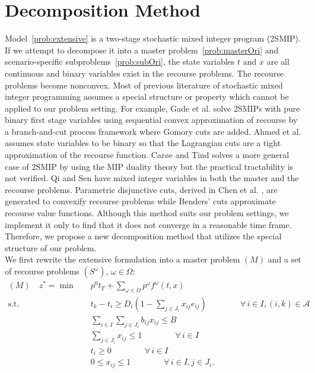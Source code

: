 \documentclass[11pt]{article}
\begin{document}
	\section{Decomposition Method} \label{sec:decomposition}
	Model~\eqref{prob:extensive} is a two-stage stochastic mixed integer program (2SMIP). If we attempt to decompose it into a master problem~\eqref{prob:masterOri} and scenario-specific subproblems~\eqref{prob:subOri}, the state variables \(t\) and \(x\) are all continuous and binary variables exist in the recourse problems. The recourse problems become nonconvex. Most of previous literature of stochastic mixed integer programming assumes a special structure or property which cannot be applied to our problem setting. For example, Gade et al. \cite{gade2014decomposition} solve 2SMIPs with pure binary first stage variables using sequential convex approximation of recourse by a branch-and-cut process framework where Gomory cuts are added. Ahmed et al. \cite{zou2016nested} assumes state variables to be binary so that the Lagrangian cuts are a tight approximation of the recourse function. Car{\o}e and Tind \cite{caroe1998shaped} solves a more general case of 2SMIP by using the MIP duality theory but the practical tractability is not verified. Qi and Sen \cite{qi2017ancestral} have mixed integer variables in both the master and the recourse problems. Parametric disjunctive cuts, derived in Chen et al. \cite{chen2012computational}, are generated to convexify recourse problems while Benders' cuts approximate recourse value functions. Although this method suits our problem settings, we implement it only to find that it does not converge in a reasonable time frame. Therefore, we propose a new decomposition method that utilizes the special structure of our problem. \\
	\newline
	We first rewrite the extensive formulation into a master problem \((M)\) and a set of recourse problems \((S^\omega)\), \(\omega \in \Omega\):
	\begin{subequations}
		\label{prob:masterOri}
		\begin{align}
		(M) \quad z^* = \min \quad &p^0 t_T + \sum_{\omega \in \Omega} p^\omega f^\omega(t,x)\\
		\text{s.t.} \quad & t_k - t_i \geq D_{i}(1 - \sum_{j \in J_i} x_{ij} e_{ij}) \qquad \qquad \forall \,i \in I, (i,k) \in \mathcal{A} \label{cons:MSep}\\
		& \sum_{i \in I} \sum_{j \in J_i} b_{ij}x_{ij} \leq B  \label{cons:MBudget}\\
		& \sum_{j \in J_i} x_{ij} \leq 1  \qquad \qquad \forall \,i \in I \label{cons:MSingleBudget}\\
		& t_i \geq 0 \qquad \qquad \forall \,i \in I\\
		& 0 \leq x_{ij} \leq 1 \qquad \qquad \forall \,i \in I, j \in J_i.
		\end{align}
	\end{subequations}
\end{document}
